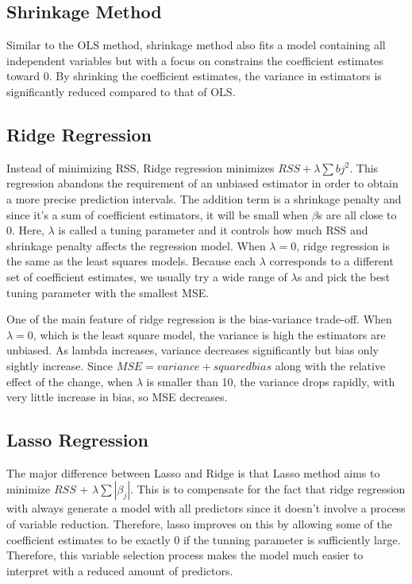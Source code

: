 \documentclass{article}
\begin{document}
\subsection{Shrinkage Method}

Similar to the OLS method, shrinkage method also fits a model containing all independent variables but with a focus on constrains the coefficient estimates toward 0. By shrinking the coefficient estimates, the variance in estimators is significantly reduced compared to that of OLS. 

\subsection{Ridge Regression }

Instead of minimizing RSS, Ridge regression minimizes $RSS + \lambda \sum bj^2$. This regression abandons the requirement of an unbiased estimator in order to obtain a more precise prediction intervals. The addition term is a shrinkage penalty and since it's a sum of coefficient estimators, it will be small when $\beta$s are all close to 0. Here, $\lambda$ is called a tuning parameter and it controls how much RSS and shrinkage penalty affects the regression model. When $\lambda = 0$, ridge regression is the same as the least squares models. Because each $\lambda$ corresponds to a different set of coefficient estimates, we usually try a wide range of $\lambda$s and pick the best tuning parameter with the smallest MSE. 

One of the main feature of ridge regression is the bias-variance trade-off. When $\lambda = 0$, which is the least square model, the variance is high the estimators are unbiased. As lambda increases, variance decreases significantly but bias only sightly increase. Since $MSE = variance + squared bias$ along with the relative effect of the change, when $\lambda$ is smaller than 10, the variance drops rapidly, with very little increase in bias, so MSE decreases. 

\subsection{Lasso Regression}

The major difference between Lasso and Ridge is that Lasso method aims to minimize $RSS$ + $\lambda \sum |{\beta_j}|$. This is to compensate for the fact that ridge regression with always generate a model with all predictors since it doesn't involve a process of variable reduction. Therefore, lasso improves on this by allowing some of the coefficient estimates to be exactly 0 if the tunning parameter is sufficiently large. Therefore, this variable selection process makes the model much easier to interpret with a reduced amount of predictors. 
\end{document}
